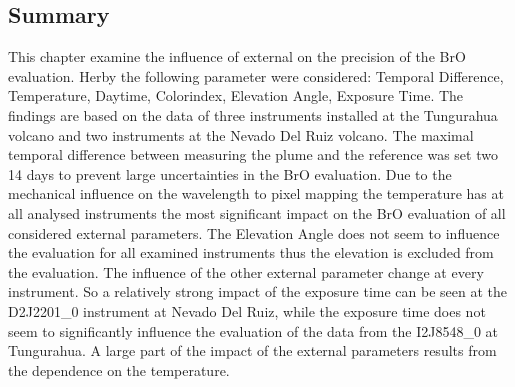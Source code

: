 \documentclass  [
  paper    = a4,
  BCOR     = 10mm,
  twoside,
  fontsize = 12pt,
  fleqn,
  toc      = bibnumbered,
  toc      = listofnumbered,
  numbers  = noendperiod,
  headings = normal,
  listof   = leveldown,
  version  = 3.03
]                                       {scrreprt}
\begin{document}
	\subsection*{Summary}
	This chapter examine the influence of external on the precision of the BrO evaluation. Herby the following parameter were considered: 
	Temporal Difference, Temperature, Daytime, Colorindex, Elevation Angle, Exposure Time.  The findings are based on the data of three instruments installed at the Tungurahua volcano and two instruments at the Nevado Del Ruiz volcano. The maximal temporal difference between measuring the plume and the reference was set two 14 days to prevent large uncertainties in the BrO evaluation. Due to the mechanical influence on the wavelength to pixel mapping the temperature has at all analysed instruments the most significant impact on the BrO evaluation of all  considered external parameters. The Elevation Angle does not seem to influence the evaluation for all examined instruments thus the elevation is excluded from the evaluation. The influence of the other external parameter change at every instrument. So a relatively strong impact of the exposure time can be seen at the D2J2201\_0 instrument at Nevado Del Ruiz, while the exposure time does not seem to significantly influence the evaluation of the data from the  I2J8548\_0 at Tungurahua. A large part of the impact of the external parameters results from the dependence on the temperature. 
\end{document}
